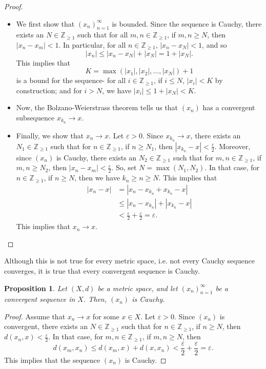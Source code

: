 \documentclass[a4paper, openany]{memoir}
\theoremstyle{definition}
\theoremstyle{plain}
\newtheorem{proposition}[definition]{Proposition}
\begin{document}
\begin{proof}
\hspace*{0pt}
\begin{itemize}
    \item We first show that $(x_n)_{n=1}^{\infty}$ is bounded. Since the sequence is Cauchy, there exists an $N \in \mathbb{Z}_{\geqslant 1}$ such that for all $m, n \in \mathbb{Z}_{\geqslant 1}$, if $m, n \geqslant N$, then $|x_n - x_m| < 1$. In particular, for all $n \in \mathbb{Z}_{\geqslant 1}$, $|x_n - x_N| < 1$, and so 
    \[|x_n| \leqslant |x_n - x_N| + |x_N| = 1 + |x_N|.\]
    This implies that
    \[K = \max (|x_1|, |x_2|, \dots, |x_N|) + 1\]
    is a bound for the sequence- for all $i \in \mathbb{Z}_{\geqslant 1}$, if $i \leqslant N$, $|x_i| < K$ by construction; and for $i > N$, we have $|x_i| \leqslant 1 + |x_N| < K$.
    
    \item Now, the Bolzano-Weierstrass theorem tells us that $(x_n)$ has a convergent subsequence $x_{k_n} \to x$.
    
    \item Finally, we show that $x_n \to x$. Let $\varepsilon > 0$. Since $x_{k_n} \to x$, there exists an $N_1 \in \mathbb{Z}_{\geqslant 1}$ such that for $n \in \mathbb{Z}_{\geqslant 1}$, if $n \geqslant N_1$, then $|x_{k_n} - x| < \frac{\varepsilon}{2}$. Moreover, since $(x_n)$ is Cauchy, there exists an $N_2 \in \mathbb{Z}_{\geqslant 1}$ such that for $m, n \in \mathbb{Z}_{\geqslant 1}$, if $m, n \geqslant N_2$, then $|x_n - x_m| < \frac{\varepsilon}{2}$. So, set $N = \max(N_1, N_2)$. In that case, for $n \in \mathbb{Z}_{\geqslant 1}$, if $n \geqslant N$, then we have $k_n \geqslant n \geqslant N$. This implies that
    \begin{align*}
        |x_n - x| &= |x_n - x_{k_n} + x_{k_n} - x| \\
        &\leqslant |x_n - x_{k_n}| + |x_{k_n} - x| \\
        &< \frac{\varepsilon}{2} + \frac{\varepsilon}{2} = \varepsilon.
    \end{align*}
    This implies that $x_n \to x$.
\end{itemize}
\end{proof}
\noindent Although this is not true for every metric space, i.e. not every Cauchy sequence converges, it is true that every convergent sequence is Cauchy.
\begin{proposition}
Let $(X, d)$ be a metric space, and let $(x_n)_{n=1}^{\infty}$ be a convergent sequence in $X$. Then, $(x_n)$ is Cauchy.
\end{proposition}
\begin{proof}
Assume that $x_n \to x$ for some $x \in X$. Let $\varepsilon > 0$. Since $(x_n)$ is convergent, there exists an $N \in \mathbb{Z}_{\geqslant 1}$ such that for $n \in \mathbb{Z}_{\geqslant 1}$, if $n \geqslant N$, then $d(x_n, x) < \frac{\varepsilon}{2}$. In that case, for $m, n \in \mathbb{Z}_{\geqslant 1}$, if $m, n \geqslant N$, then
\[d(x_m, x_n) \leqslant d(x_m, x) + d(x, x_n) < \frac{\varepsilon}{2} + \frac{\varepsilon}{2} = \varepsilon.\]
This implies that the sequence $(x_n)$ is Cauchy.
\end{proof}
\end{document}
